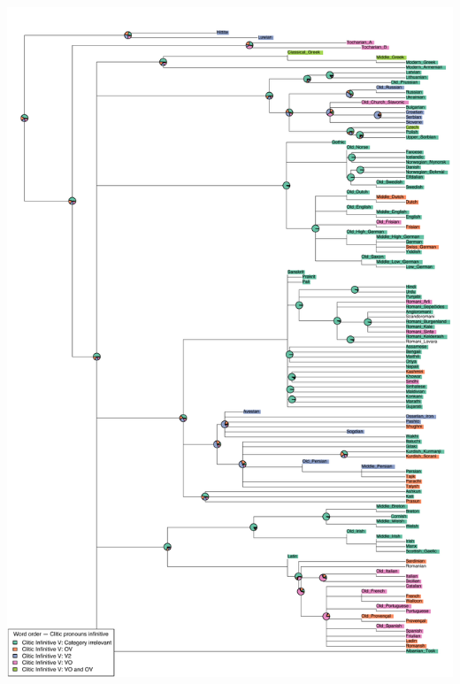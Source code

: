 \includegraphics[width=.9\linewidth]{supp-graphics/WordorderCliticpronounsinfinitive2ndpositionWordorderCliticpronounsinfinitiveOVWordorderCliticpronounsinfinitiveVO.pdf}

